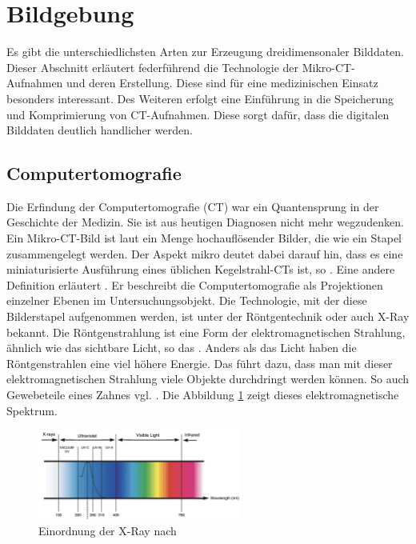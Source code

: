\section{Bildgebung}
\label{sec:technologisch} Es gibt die unterschiedlichsten Arten zur Erzeugung dreidimensonaler
Bilddaten. Dieser Abschnitt erläutert federführend die Technologie der Mikro-\ac{CT}-Aufnahmen
und deren Erstellung. Diese sind für eine medizinischen Einsatz besonders
interessant. Des Weiteren erfolgt eine Einführung in die Speicherung und Komprimierung
von \ac{CT}-Aufnahmen. Diese sorgt dafür, dass die digitalen Bilddaten deutlich
handlicher werden.

\subsection{Computertomografie}
\label{subsec:computertomografie} Die Erfindung der Computertomografie (\ac{CT})
war ein Quantensprung in der Geschichte der Medizin. Sie ist aus heutigen
Diagnosen nicht mehr wegzudenken. Ein Mikro-\ac{CT}-Bild ist laut \citet[Abstract]{baird2017}
ein Menge hochauflösender Bilder, die wie ein Stapel zusammengelegt werden. Der
Aspekt mikro deutet dabei darauf hin, dass es eine miniaturisierte Ausführung eines
üblichen Kegelstrahl-\ac{CT}s ist, so \citet[Seite 340]{buzug2011}. Eine andere Definition
erläutert \citet{lehmann2013bildverarbeitung}. Er beschreibt die Computertomografie
als Projektionen einzelner Ebenen im Untersuchungsobjekt. Die Technologie, mit der
diese Bilderstapel aufgenommen werden, ist unter der Röntgentechnik oder auch
\ac{X-Ray} bekannt. Die Röntgenstrahlung ist eine Form der elektromagnetischen
Strahlung, ähnlich wie das sichtbare Licht, so das \citet{nib2024}. Anders als
das Licht haben die Röntgenstrahlen eine viel höhere Energie. Das führt dazu,
dass man mit dieser elektromagnetischen Strahlung viele Objekte durchdringt
werden können. So auch Gewebeteile eines Zahnes vgl. \citep{nib2024}. Die
Abbildung \ref{fig:spectrum} zeigt dieses elektromagnetische Spektrum.

\begin{figure}[h]
	\centering
	\includegraphics[width=0.6\textwidth]{img/x_ray.jpg}
	\caption{Einordnung der \ac{X-Ray} nach \citet{zwinkels2015}}
	\label{fig:spectrum}
\end{figure}


